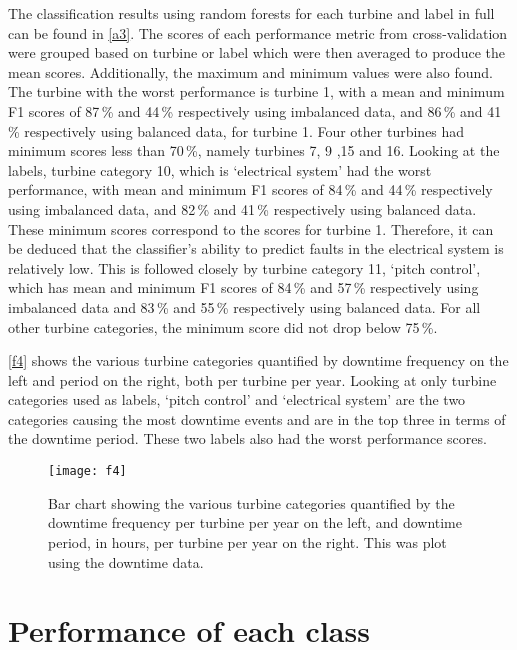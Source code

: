The classification results using random forests for each turbine and label in full can be found in \autoref{a3}. The scores of each performance metric from cross-validation were grouped based on turbine or label which were then averaged to produce the mean scores. Additionally, the maximum and minimum values were also found. The turbine with the worst performance is turbine 1, with a mean and minimum F1 scores of 87\,\% and 44\,\% respectively using imbalanced data, and 86\,\% and 41\,\% respectively using balanced data, for turbine 1. Four other turbines had minimum scores less than 70\,\%, namely turbines 7, 9 ,15 and 16. Looking at the labels, turbine category 10, which is `electrical system' had the worst performance, with mean and minimum F1 scores of 84\,\% and 44\,\% respectively using imbalanced data, and 82\,\% and 41\,\% respectively using balanced data. These minimum scores correspond to the scores for turbine 1. Therefore, it can be deduced that the classifier's ability to predict faults in the electrical system is relatively low. This is followed closely by turbine category 11, `pitch control', which has mean and minimum F1 scores of 84\,\% and 57\,\% respectively using imbalanced data and 83\,\% and 55\,\% respectively using balanced data. For all other turbine categories, the minimum score did not drop below 75\,\%.

\autoref{f4} shows the various turbine categories quantified by downtime frequency on the left and period on the right, both per turbine per year. Looking at only turbine categories used as labels, `pitch control' and `electrical system' are the two categories causing the most downtime events and are in the top three in terms of the downtime period. These two labels also had the worst performance scores.

\begin{figure}
  \centering
  \texttt{[image: f4]}
  \caption{\label{f4}Bar chart showing the various turbine categories quantified by the downtime frequency per turbine per year on the left, and downtime period, in hours, per turbine per year on the right. This was plot using the downtime data.}
\end{figure}

\section{Performance of each class}

